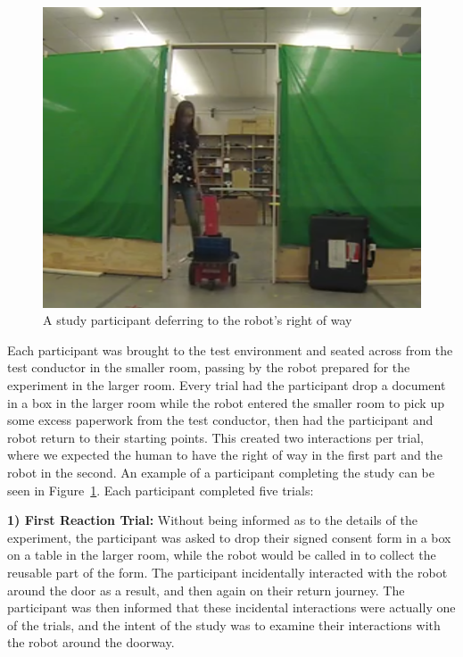 \documentclass[letterpaper, 10 pt, conference]{ieeeconf}  %
\begin{document}
     \begin{figure}
      \centering
      \includegraphics[scale=0.5]{test_example.png}
      \caption{A study participant deferring to the robot's right of way}
      \label{fig:Example}
   \end{figure}

Each participant was brought to the test environment and seated across from the test conductor in the smaller room, passing by the robot prepared for the experiment in the larger room. Every trial had the participant drop a document in a box in the larger room while the robot entered the smaller room to pick up some excess paperwork from the test conductor, then had the participant and robot return to their starting points. This created two interactions per trial, where we expected the human to have the right of way in the first part and the robot in the second. An example of a participant completing the study can be seen in Figure~\ref{fig:Example}. Each participant completed five trials:

\textbf{1) First Reaction Trial:} Without being informed as to the details of the experiment, the participant was asked to drop their signed consent form in a box on a table in the larger room, while the robot would be called in to collect the reusable part of the form. The participant incidentally interacted with the robot around the door as a result, and then again on their return journey. The participant was then informed that these incidental interactions were actually one of the trials, and the intent of the study was to examine their interactions with the robot around the doorway.
\end{document}
